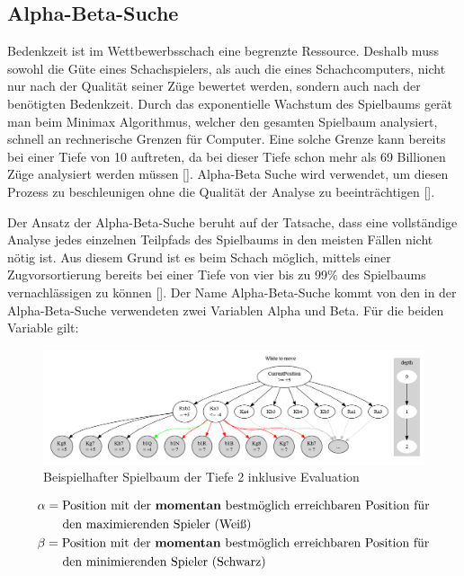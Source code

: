\subsection{Alpha-Beta-Suche} \label{ch:alpha-beta-pruning}

Bedenkzeit ist im Wettbewerbsschach eine begrenzte Ressource.
Deshalb muss sowohl die Güte eines Schachspielers, als auch die eines Schachcomputers, nicht nur nach der Qualität seiner Züge bewertet werden, sondern auch nach der benötigten Bedenkzeit.
Durch das exponentielle Wachstum des Spielbaums gerät man beim Minimax Algorithmus, welcher den gesamten Spielbaum analysiert, schnell an rechnerische Grenzen für Computer.
Eine solche Grenze kann bereits bei einer Tiefe von 10 auftreten, da bei dieser Tiefe schon mehr als 69 Billionen Züge analysiert werden müssen [\cite{Wikipedia2020a}].
Alpha-Beta Suche wird verwendet, um diesen Prozess zu beschleunigen ohne die Qualität der Analyse zu beeinträchtigen [\cite{Knuth1975}].

Der Ansatz der Alpha-Beta-Suche beruht auf der Tatsache, dass eine vollständige Analyse jedes einzelnen Teilpfads des Spielbaums in den meisten Fällen nicht nötig ist.
Aus diesem Grund ist es beim Schach möglich, mittels einer Zugvorsortierung bereits bei einer Tiefe von vier bis zu 99\% des Spielbaums vernachlässigen zu können [\cite{Wikipedia2019}].
Der Name Alpha-Beta-Suche kommt von den in der Alpha-Beta-Suche verwendeten zwei Variablen Alpha und Beta.
Für die beiden Variable gilt:

\begin{figure}
    \centering
    \includegraphics[width=\textwidth]{images/theory/AlphaBetaExample2.png}
    \caption[Beispielhafter Spielbaum der Tiefe 2 inklusive Evaluation]{Beispielhafter Spielbaum der Tiefe 2 inklusive Evaluation}
    \label{fig:alpha-beta_game-tree}
\end{figure}

\begin{align*}
    \begin{split}
        & \alpha = \text{Position mit der \textbf{momentan} bestmöglich erreichbaren Position für} \\
        & \quad\quad \text{den maximierenden Spieler (Weiß)} \\
        & \beta = \text{Position mit der \textbf{momentan} bestmöglich erreichbaren Position für} \\
        & \quad\quad \text{den minimierenden Spieler (Schwarz)}    
    \end{split}
\end{align*}

